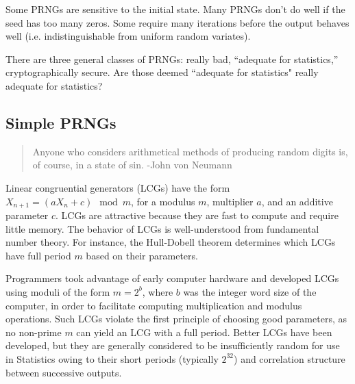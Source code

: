 \documentclass[graybox]{svmult}
\begin{document}
Some PRNGs are sensitive to the initial state.
Many PRNGs don't do well if the seed has too many zeros.
Some require many iterations before the output behaves well (i.e. indistinguishable from uniform random variates).

There are three general classes of PRNGs: really bad, ``adequate for statistics,'' cryptographically secure.
Are those deemed ``adequate for statistics" really adequate for statistics?

\subsection{Simple PRNGs}

\begin{quotation}
Anyone who considers arithmetical methods of producing random digits is, of course, in a state of sin.  -John von Neumann
\end{quotation}


Linear congruential generators (LCGs) have the form $X_{n+1} = (a X_n + c) \mod m$, for a modulus $m$, 
multiplier $a$, and an additive parameter $c$.
LCGs are attractive because they are fast to compute and require little memory.
The behavior of LCGs is well-understood from fundamental number theory.
For instance, the Hull-Dobell theorem determines which LCGs have full period $m$ based on their parameters.
%

Programmers took advantage of early computer hardware and developed LCGs using moduli of the form $m = 2^b$, where
$b$ was the integer word size of the computer, in order to facilitate computing multiplication and modulus operations.
Such LCGs violate the first principle of choosing good parameters, as no non-prime $m$ can yield an LCG with a full period.
Better LCGs have been developed, but they are generally considered to be insufficiently random for use in Statistics owing to their short periods (typically $2^{32}$) and correlation structure between successive outputs.
\end{document}
